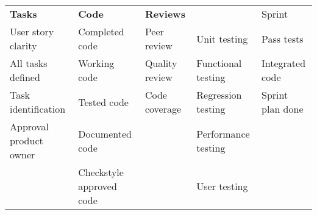 \begin{tabular}{lllll}
	\textbf{Tasks} & \textbf{Code} & \textbf{Reviews} & \textbf{Testing & Sprint} \\
	User story clarity & Completed code & Peer review & Unit testing & Pass tests \\
	All tasks defined & Working code & Quality review & Functional testing & Integrated code \\
	Task identification & Tested code & Code coverage & Regression testing & Sprint plan done \\
	Approval product owner & Documented code &  & Performance testing & \\
	& Checkstyle approved code &  & User testing & \\
\end{tabular}